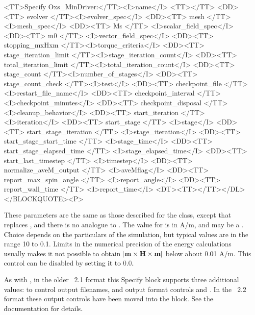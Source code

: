 \begin{description}
\begin{rawhtml}
<TT>Specify Oxs_MinDriver:</TT><I>name</I> <TT>{</TT>
<DD><TT> evolver </TT><I>evolver_spec</I>
<DD><TT> mesh </TT><I>mesh_spec</I>
<DD><TT> Ms </TT> <I>scalar_field_spec</I>
<DD><TT> m0 </TT> <I>vector_field_spec</I>
<DD><TT> stopping_mxHxm </TT><I>torque_criteria</I>
<DD><TT> stage_iteration_limit </TT><I>stage_iteration_count</I>
<DD><TT> total_iteration_limit </TT><I>total_iteration_count</I>
<DD><TT> stage_count </TT><I>number_of_stages</I>
<DD><TT> stage_count_check </TT><I>test</I>
<DD><TT> checkpoint_file </TT> <I>restart_file_name</I>
<DD><TT> checkpoint_interval </TT> <I>checkpoint_minutes</I>
<DD><TT> checkpoint_disposal </TT> <I>cleanup_behavior</I>
<DD><TT> start_iteration </TT> <I>iteration</I>
<DD><TT> start_stage </TT> <I>stage</I>
<DD><TT> start_stage_iteration </TT> <I>stage_iteration</I>
<DD><TT> start_stage_start_time </TT> <I>stage_time</I>
<DD><TT> start_stage_elapsed_time </TT> <I>stage_elapsed_time</I>
<DD><TT> start_last_timestep </TT> <I>timestep</I>
<DD><TT> normalize_aveM_output </TT> <I>aveMflag</I>
<DD><TT> report_max_spin_angle </TT> <I>report_angle</I>
<DD><TT> report_wall_time </TT> <I>report_time</I>
<DT><TT>}</TT></DL></BLOCKQUOTE><P>
\end{rawhtml}
These parameters are the same as those described for the
class, except that
 replaces , and there is no
analogue to .  The value for  is
in A/m, and may be a
.
Choice depends on the particulars of the simulation, but typical values
are in the range 10 to 0.1.  Limits in the numerical precision of the
energy calculations usually makes it not possible to obtain
$|\textbf{m}\times\textbf{H}\times\textbf{m}|$ below about 0.01 A/m.  This control can be
disabled by setting it to 0.0.

As with , in the older \MIF~2.1 format this Specify
block supports three additional values:  to control
output filenames, and output format controls
 and
.  In the \MIF~2.2 format these
output controls have been moved into the  block.  See the
documentation for details.


\end{description}
